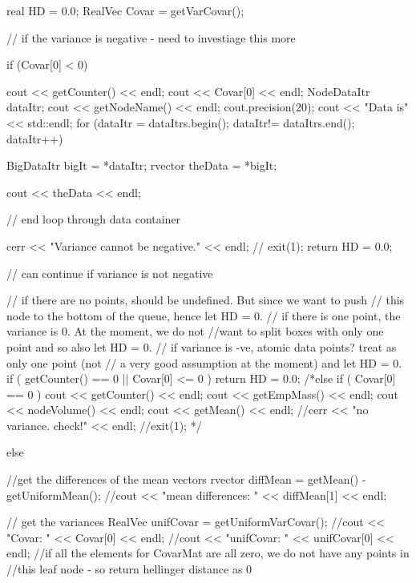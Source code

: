 \begin{DoxyCode}
   {
    real HD = 0.0; 
    RealVec Covar = getVarCovar();

    // if the variance is negative - need to investiage this more
    
    if (Covar[0] < 0) {
      cout << getCounter() << endl;
      cout << Covar[0] << endl;
      NodeDataItr dataItr;
      cout << getNodeName() << endl;
      cout.precision(20);
      cout << "Data is" << std::endl;
          for (dataItr = dataItrs.begin();
                dataItr!= dataItrs.end(); dataItr++) {

                BigDataItr bigIt = *dataItr;
                rvector theData = *bigIt;

                cout << theData << endl; 
      } // end loop through data container
      
      cerr << "Variance cannot be negative." << endl; 
    //  exit(1);
      return HD = 0.0; 
    }

    // can continue if variance is not negative

      // if there are no points, should be undefined. But since we want to push
      // this node to the bottom of the queue, hence let HD = 0.
      // if there is one point, the variance is 0. At the moment, we do not 
      //want to split boxes with only one point and so also let HD = 0.
      // if variance is -ve, atomic data points? treat as only one point (not
      // a very good assumption at the moment) and let HD = 0. 
      if ( getCounter() == 0  || Covar[0] <= 0 ) { return HD = 0.0; } 
      /*else if ( Covar[0] == 0 ) { 
        cout << getCounter() << endl;
        cout << getEmpMass() << endl;
        cout << nodeVolume() << endl;
        cout << getMean() << endl;
        //cerr << "no variance. check!" << endl;
        //exit(1);
      }*/

      else {
        //get the differences of the mean vectors
        rvector diffMean = getMean() - getUniformMean();
        //cout << "mean differences: " << diffMean[1] << endl;
        
        // get the variances
        RealVec unifCovar = getUniformVarCovar();
        //cout << "Covar: " << Covar[0] <<  endl;
        //cout << "unifCovar: " << unifCovar[0] << endl;
        //if all the elements for CovarMat are all zero, we do not have any
       points in 
        //this leaf node - so return hellinger distance as 0
  
}}
\end{DoxyCode}
